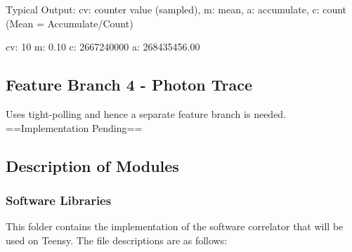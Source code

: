 Typical Output\+: cv\+: counter value (sampled), m\+: mean, a\+: accumulate, c\+: count (Mean = Accumulate/\+Count)


\begin{DoxyCode}
cv: 10  m: 0.10  c: 2667240000  a: 268435456.00
\end{DoxyCode}


\subsection*{Feature Branch 4 -\/ Photon Trace}

Uses tight-\/polling and hence a separate feature branch is needed. ==Implementation Pending==

\subsection*{Description of Modules}

\subsubsection*{Software Libraries}

This folder contains the implementation of the software correlator that will be used on Teensy. The file descriptions are as follows\+:


